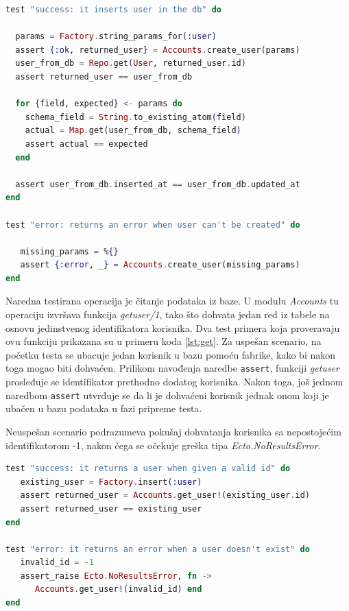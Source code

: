 \documentclass[12pt,oneside]{memoir}
\begin{document}
\begin{minipage}{\linewidth}
\begin{lstlisting}[language=elixir, basicstyle=\small, caption={Testiranje funkcije \emph{create{\textunderscore}user/1}},captionpos=b, label={lst:create}]
test "success: it inserts user in the db" do
  
  params = Factory.string_params_for(:user)
  assert {:ok, returned_user} = Accounts.create_user(params)
  user_from_db = Repo.get(User, returned_user.id)
  assert returned_user == user_from_db

  for {field, expected} <- params do
    schema_field = String.to_existing_atom(field)
    actual = Map.get(user_from_db, schema_field)
    assert actual == expected
  end
  
  assert user_from_db.inserted_at == user_from_db.updated_at
end

test "error: returns an error when user can't be created" do
   
   missing_params = %{}
   assert {:error, _} = Accounts.create_user(missing_params)
end 
\end{lstlisting}
 \end{minipage}
 
 \vspace*{1\baselineskip}
\par Naredna testirana operacija je čitanje podataka iz baze. U modulu \emph{Accounts} tu operaciju izvršava funkcija \emph{get{\textunderscore}user/1}, tako što dohvata jedan red iz tabele na osnovu jedinstvenog identifikatora korisnika. Dva test primera koja proveravaju ovu funkciju prikazana su u primeru koda \ref{lst:get}. Za uspešan scenario, na početku testa se ubacuje jedan korisnik u bazu pomoću fabrike, kako bi nakon toga mogao biti dohvaćen. Prilikom navođenja naredbe \texttt{assert}, funkciji \emph{get{\textunderscore}user} prosleđuje se identifikator prethodno dodatog korisnika. Nakon toga, još jednom naredbom \texttt{assert} utvrđuje se da li je dohvaćeni korisnik jednak onom koji je ubačen u bazu podataka u fazi pripreme testa.
\par Neuspešan scenario podrazumeva pokušaj dohvatanja korisnika sa nepostojećim identifikatorom -1, nakon čega se očekuje greška tipa \emph{Ecto.NoResultsError}. \\
 
 \begin{minipage}{\linewidth}
\begin{lstlisting}[language=elixir, basicstyle=\small, caption={Testiranje funkcije \emph{get{\textunderscore}user/1}},captionpos=b, label={lst:get}]
test "success: it returns a user when given a valid id" do
   existing_user = Factory.insert(:user)
   assert returned_user = Accounts.get_user!(existing_user.id)
   assert returned_user == existing_user
end

test "error: it returns an error when a user doesn't exist" do
   invalid_id = -1
   assert_raise Ecto.NoResultsError, fn ->
      Accounts.get_user!(invalid_id) end
end
\end{lstlisting}
\end{minipage}
\end{document}
